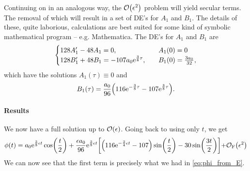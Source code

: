 \documentclass[11pt,letter, swedish, english,%
]{article}
\begin{document}
Continuing on in an analogous way, the $\order{\epsilon^2}$ problem
will yield secular terms. The removal of which will result in a set of
DE's for $A_1$ and $B_1$. The details of these, quite laborious,
calculations are best suited for some kind of symbolic mathematical
program -- e.g. Mathematica. The DE's for $A_1$ and $B_1$ are 
\begin{equation}
\begin{cases}
128A_1'-48A_1=0\qcomma&A_1(0)=0\\
128B_1'+48B_1=-107a_0\ee^{\frac{3}{8}\tau}\qcomma&B_1(0)=\frac{3a_0}{32},
\end{cases}
\end{equation}
which have the solutions $A_1(\tau)\equiv0$ and
\begin{equation}
B_1(\tau)=\frac{a_0}{96}
\qty(116\mathrm{e}^{-\frac{3}{8}\tau}-107\mathrm{e}^{\frac{3}{8}\tau}).
\end{equation}

\paragraph{Results}
We now have a full solution up to $\order{\epsilon}$.
Going back to using only $t$, we get
\begin{equation}
\phi(t)=a_0\mathrm{e}^{\frac{3}{8}\epsilon{t}}\cos(\frac{t}{2})
+\frac{\epsilon a_0}{96}\mathrm{e}^{\frac{3}{8}\epsilon{t}}\qty[
\qty(116\mathrm{e}^{-\frac{3}{4}\epsilon{t}}-107)
\sin(\frac{t}{2})
-30\sin(\frac{3t}{2})]
{+}\mathcal{O}_\text{F}\qty(\epsilon^2)
\end{equation}
We can now see that the first term is precisely what we had in
\eqref{eq:phi_from_E}. 
\end{document}
